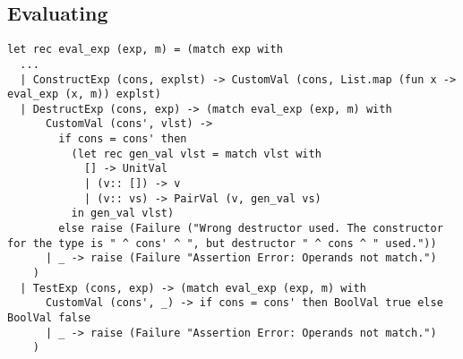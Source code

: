 \documentclass[a4paper,12pt]{article}
\begin{document}
	\subsection{Evaluating}
		\begin{lstlisting}
let rec eval_exp (exp, m) = (match exp with
  ...
  | ConstructExp (cons, explst) -> CustomVal (cons, List.map (fun x -> eval_exp (x, m)) explst)
  | DestructExp (cons, exp) -> (match eval_exp (exp, m) with
      CustomVal (cons', vlst) -> 
		if cons = cons' then 
          (let rec gen_val vlst = match vlst with
            [] -> UnitVal
            | (v:: []) -> v
            | (v:: vs) -> PairVal (v, gen_val vs) 
          in gen_val vlst)
        else raise (Failure ("Wrong destructor used. The constructor for the type is " ^ cons' ^ ", but destructor " ^ cons ^ " used."))
      | _ -> raise (Failure "Assertion Error: Operands not match.")
    )
  | TestExp (cons, exp) -> (match eval_exp (exp, m) with
      CustomVal (cons', _) -> if cons = cons' then BoolVal true else BoolVal false
      | _ -> raise (Failure "Assertion Error: Operands not match.")
    )
		\end{lstlisting}
\end{document}
